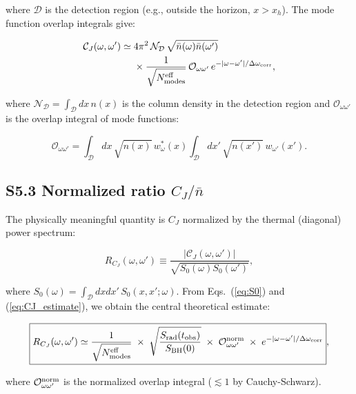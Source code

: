 \documentclass[prd,aps,showpacs,superscriptaddress,twocolumn]{revtex4-2}
\begin{document}
where $\mathcal{D}$ is the detection region (e.g., outside the horizon, $x > x_h$). The mode function overlap integrals give:

\begin{align}
\mathcal{C}_J(\omega,\omega') \simeq \; &4\pi^2 \, \mathcal{N}_{\mathcal{D}} \, \sqrt{\bar{n}(\omega)\bar{n}(\omega')} \, \nonumber\\
&\times \frac{1}{\sqrt{N_{\rm modes}^{\rm eff}}} \, \mathcal{O}_{\omega\omega'} \, e^{-|\omega-\omega'|/\Delta\omega_{\rm corr}},
\label{eq:CJ_estimate}
\end{align}

where $\mathcal{N}_{\mathcal{D}} = \int_\mathcal{D} dx \, n(x)$ is the column density in the detection region and $\mathcal{O}_{\omega\omega'}$ is the overlap integral of mode functions:

\begin{equation}
\mathcal{O}_{\omega\omega'} = \int_\mathcal{D} dx \, \sqrt{n(x)} \, w_\omega^*(x) \int_\mathcal{D} dx' \, \sqrt{n(x')} \, w_{\omega'}(x').
\label{eq:overlap}
\end{equation}

\subsection{S5.3 Normalized ratio $C_J / \bar{n}$}

The physically meaningful quantity is $C_J$ normalized by the thermal (diagonal) power spectrum:

\begin{equation}
R_{C_J}(\omega,\omega') \equiv \frac{|\mathcal{C}_J(\omega,\omega')|}{\sqrt{S_0(\omega) S_0(\omega')}},
\label{eq:ratio_def}
\end{equation}

where $S_0(\omega) = \int_\mathcal{D} dx dx' \, S_0(x,x';\omega)$. From Eqs.~(\ref{eq:S0}) and (\ref{eq:CJ_estimate}), we obtain the central theoretical estimate:

\begin{equation}
\boxed{R_{C_J}(\omega,\omega') \simeq \frac{1}{\sqrt{N_{\rm modes}^{\rm eff}}} \; \times \; \sqrt{\frac{S_{\rm rad}(t_{\rm obs})}{S_{\rm BH}(0)}} \; \times \; \mathcal{O}_{\omega\omega'}^{\rm norm} \; \times \; e^{-|\omega-\omega'|/\Delta\omega_{\rm corr}}},
\label{eq:central_estimate}
\end{equation}

where $\mathcal{O}_{\omega\omega'}^{\rm norm}$ is the normalized overlap integral ($\lesssim 1$ by Cauchy-Schwarz).
\end{document}
